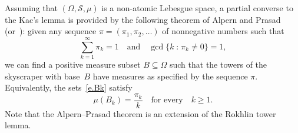 \documentclass[10pt]{amsart}
\theoremstyle{definition}\newtheorem{defi}[theo]{Definition}\newtheorem{rema}[theo]{Remark}\newtheorem{exam}[theo]{Example}\newtheorem{exem}[theo]{Example}\newtheorem{nota}[theo]{Notation}
\DeclareMathOperator{\gcdd}{gcd}
\newcommand{\st}{\;\mathord{:}\;}
\newcommand{\clS}{\mathcal{S}}
\begin{document}
Assuming that $(\Omega,\clS,\mu)$ is a non-atomic Lebesgue space, a partial converse to the Kac's lemma is provided by the following theorem of Alpern and Prasad~\cite{AP_paper} (or~\cite[Theorem~A.1.4]{AP_book}): given any sequence $\pi = (\pi_1,\pi_2,\dots)$ of nonnegative numbers such that
\begin{equation}
\sum_{k=1}^\infty \pi_k = 1 \quad \text{and} \quad \gcdd\{k \st \pi_k \neq 0\} = 1,
\end{equation}
we can find a positive measure subset $B \subseteq \Omega$ such that the towers of the skyscraper with base~$B$ have measures as specified by the sequence $\pi$. Equivalently, the sets~\eqref{e.Bk} satisfy
\begin{equation}\label{e.AP}
\mu(B_k) = \frac{\pi_k}{k} \quad \text{for every}\quad k \ge 1.
\end{equation}
Note that the Alpern--Prasad theorem is an extension of the Rokhlin tower lemma.
\end{document}
